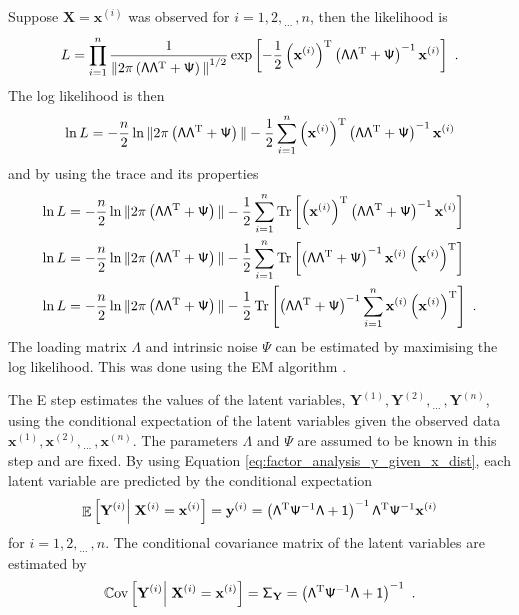 \documentclass[12pt]{report}
\DeclareMathOperator{\expectation}{\mathbb{E}}
\DeclareMathOperator{\cov}{\mathbb{C}ov}
\DeclareMathOperator{\trace}{Tr}
\newcommand{\T}{^\textup{T}}
\newcommand{\dotdotdot}{_{\phantom{.}\cdots}}
\newcommand{\vect}[1]{\mathbf{#1}}
\newcommand{\matr}[1]{\mathsf{#1}}
\begin{document}
Suppose $\vect{X}=\vect{x}^{(i)}$ was observed for $i=1,2,\dotdotdot,n$, then the likelihood is
\begin{equation}
L=\prod_{i=1}^n\frac{1}{{\|2\pi\left(\matr{\Lambda}\matr{\Lambda}\T+\matr{\Psi}\right)\|}^{1/2}}
\exp\left[-\frac{1}{2}\left(\vect{x}^{(i)}\right)\T\left(\matr{\Lambda}\matr{\Lambda}\T+\matr{\Psi}\right)^{-1}\vect{x}^{(i)}\right] \ .
\end{equation}
The log likelihood is then
\begin{equation*}
\ln{L}=-\frac{n}{2}\ln{\|2\pi\left(\matr{\Lambda}\matr{\Lambda}\T+\matr{\Psi}\right)\|}-\frac{1}{2}\sum_{i=1}^{n}\left(\vect{x}^{(i)}\right)\T\left(\matr{\Lambda}\matr{\Lambda}\T+\matr{\Psi}\right)^{-1}\vect{x}^{(i)}
\end{equation*}
and by using the trace and its properties
\begin{align}
\ln{L}&=-\frac{n}{2}\ln{\|2\pi\left(\matr{\Lambda}\matr{\Lambda}\T+\matr{\Psi}\right)\|}-\frac{1}{2}\sum_{i=1}^{n}\trace\left[\left(\vect{x}^{(i)}\right)\T\left(\matr{\Lambda}\matr{\Lambda}\T+\matr{\Psi}\right)^{-1}\vect{x}^{(i)}\right]
\nonumber \\
\ln{L}&=-\frac{n}{2}\ln{\|2\pi\left(\matr{\Lambda}\matr{\Lambda}\T+\matr{\Psi}\right)\|}-\frac{1}{2}\sum_{i=1}^{n}\trace\left[\left(\matr{\Lambda}\matr{\Lambda}\T+\matr{\Psi}\right)^{-1}\vect{x}^{(i)}\left(\vect{x}^{(i)}\right)\T\right]
\nonumber \\
\ln{L}&=-\frac{n}{2}\ln{\|2\pi\left(\matr{\Lambda}\matr{\Lambda}\T+\matr{\Psi}\right)\|}-\frac{1}{2}\trace\left[\left(\matr{\Lambda}\matr{\Lambda}\T+\matr{\Psi}\right)^{-1}\sum_{i=1}^{n}\vect{x}^{(i)}\left(\vect{x}^{(i)}\right)\T\right] \ .
\end{align}
The loading matrix $\matr{\Lambda}$ and intrinsic noise $\matr{\Psi}$ can be estimated by maximising the log likelihood. This was done using the EM algorithm \cite[pp.~260-261]{barber2012bayesian}.

The E step estimates the values of the latent variables, $\vect{Y}^{(1)},\vect{Y}^{(2)},\dotdotdot,\vect{Y}^{(n)}$, using the conditional expectation of the latent variables given the observed data $\vect{x}^{(1)},\vect{x}^{(2)},\dotdotdot,\vect{x}^{(n)}$. The parameters $\matr{\Lambda}$ and $\matr{\Psi}$ are assumed to be known in this step and are fixed. By using Equation \eqref{eq:factor_analysis_y_given_x_dist}, each latent variable are predicted by the conditional expectation
\begin{equation}
\expectation\left[\vect{Y}^{(i)}\right|\left.\vect{X}^{(i)}=\vect{x}^{(i)}\right]=\vect{y}^{(i)} = \left(\matr{\Lambda}\T\matr{\Psi}^{-1}\matr{\Lambda}+\matr{1}\right)^{-1}\matr{\Lambda}\T\matr{\Psi}^{-1}\vect{x}^{(i)}
\end{equation}
for $i=1,2,\dotdotdot,n$. The conditional covariance matrix of the latent variables are estimated by
\begin{equation}
\cov\left[\vect{Y}^{(i)}\right|\left.\vect{X}^{(i)}=\vect{x}^{(i)}\right]=\matr{\Sigma}_{\vect{Y}} = \left(\matr{\Lambda}\T\matr{\Psi}^{-1}\matr{\Lambda}+\matr{1}\right)^{-1} \ .
\end{equation}
\end{document}
